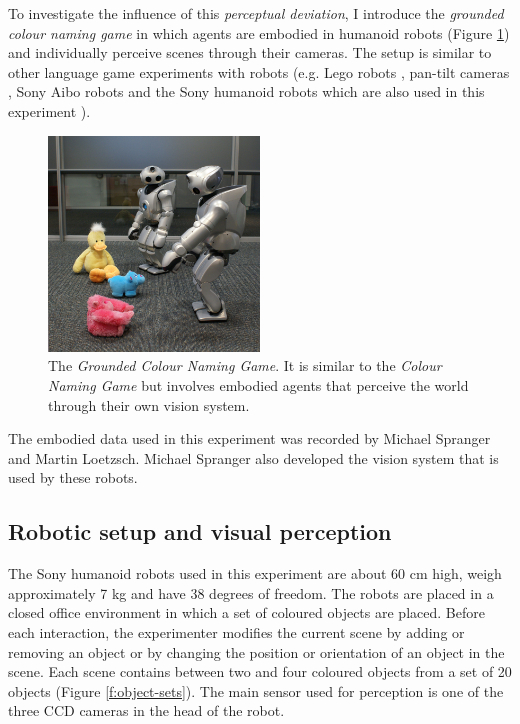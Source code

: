 To investigate the influence of this \emph{perceptual deviation}, I
introduce the \emph{ground\-ed colour naming game} in which agents are
embodied in humanoid robots (Figure
\ref{f:grounded-colour-naming-game}) and individually perceive scenes
through their cameras. The setup is similar to other language game
experiments with robots (e.g. Lego robots \citep{vogt03anchoring},
pan-tilt cameras \citep{steels98origins}, Sony Aibo robots
\citep{steels09perspective, loetzsch08typological} and the Sony
humanoid robots which are also used in this experiment
\citep{wellens08flexible}).

\begin{figure}[htpb]
  \centerline{\includegraphics[width=0.5\textwidth]{./experiments/figures/grounding-cng-small}}
  \caption[The Grounded Colour Naming Game]{The \emph{Grounded Colour
      Naming Game}. It is similar to the \emph{Colour Naming Game} but
    involves embodied agents that perceive the world through their own
    vision system.}
\label{f:grounded-colour-naming-game}
\end{figure}

The embodied data used in this experiment was recorded by Michael
Spranger and Martin Loetzsch. Michael Spranger also developed the
vision system that is used by these robots.

\subsection{Robotic setup and visual perception}

The Sony humanoid robots \citep{fujita03autonomous} used in this
experiment are about 60 cm high, weigh approximately 7 kg and have 38
degrees of freedom. The robots are placed in a closed office
environment in which a set of coloured objects are placed. Before each
interaction, the experimenter modifies the current scene by adding or
removing an object or by changing the position or orientation of an
object in the scene. Each scene contains between two and four coloured
objects from a set of 20 objects (Figure \ref{f:object-sets}). The
main sensor used for perception is one of the three CCD cameras in the
head of the robot.

